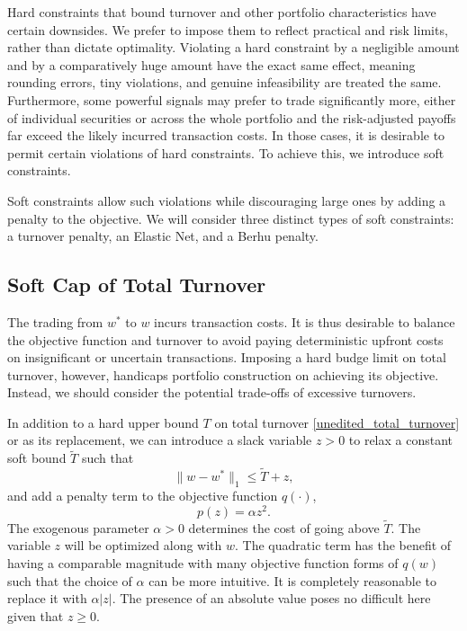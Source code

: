 \documentclass[11pt, letterpaper]{article}
\begin{document}
Hard constraints that bound turnover and other portfolio characteristics have certain downsides. We prefer to impose them to
reflect practical and risk limits, rather than dictate optimality. Violating a hard constraint by a negligible amount and by a
comparatively huge amount have the exact same effect, meaning rounding errors, tiny violations, and genuine infeasibility are
treated the same. Furthermore, some powerful signals may prefer to trade significantly more, either of individual securities or
across the whole portfolio and the risk-adjusted payoffs far exceed the likely incurred transaction costs. In those cases, it is
desirable to permit certain violations of hard constraints. To achieve this, we introduce soft constraints.

Soft constraints allow such violations while discouraging large ones by adding a penalty to the objective. We will consider three
distinct types of soft constraints: a turnover penalty, an Elastic Net, and a Berhu penalty.

\subsection{Soft Cap of Total Turnover}
The trading from $w^*$ to $w$ incurs transaction costs. It is thus desirable to balance the objective function and turnover to
avoid paying deterministic upfront costs on insignificant or uncertain transactions. Imposing a hard budge limit on total
turnover, however, handicaps portfolio construction on achieving its objective. Instead, we should consider the potential
trade-offs of excessive turnovers.

In addition to a hard upper bound $T$ on total turnover \eqref{unedited_total_turnover} or as its replacement, we can introduce
a slack variable $z > 0$ to relax a constant soft bound $\tilde{T}$ such that
\begin{equation*}
	\lVert w - w^*\rVert_1 \leq \tilde{T} + z,
\end{equation*}
and add a penalty term to the objective function $q(\cdot)$,
\begin{equation}\label{eq:tvr-total}
	p(z) = \alpha z^2.
\end{equation}
The exogenous parameter $\alpha > 0$ determines the cost of going above $\tilde{T}$. The variable $z$ will be optimized along
with $w$. The quadratic term has the benefit of having a comparable magnitude with many objective function forms of $q(w)$ such
that the choice of $\alpha$ can be more intuitive. It is completely reasonable to replace it with $\alpha |z|$. The presence of
an absolute value poses no difficult here given that $z \geq 0$.
\end{document}
